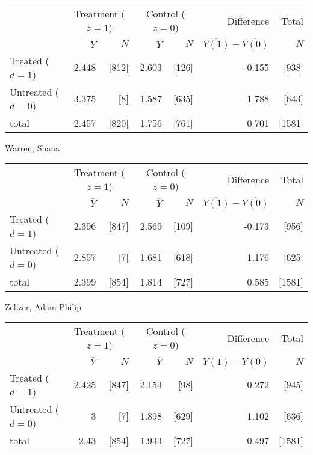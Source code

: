 \documentclass[11pt,notitlepage]{article}
\begin{document}
\begin{table}[h!]
\begin{center}
\begin{tabular}{l|rr|rr|rr}
  \hline
 & \multicolumn{2}{c|}{Treatment ($z=1$)} & \multicolumn{2}{c|}{Control ($z=0$)} & Difference & Total \\
 & $\overline{Y}$ & $N$ & $\overline{Y}$ & $N$ & $\overline{Y(1)} - \overline{Y(0)}$ & $N$ \\ 
  \hline
Treated ($d=1$) &  2.448 & [812] & 2.603 & [126] & -0.155 & [938] \\ 
  Untreated ($d=0$) & 3.375 & [8] & 1.587 & [635] & 1.788 & [643] \\ 
  \hline
  total & 2.457 & [820] & 1.756 & [761] & 0.701 & [1581] \\ 
   \hline
\end{tabular}
\end{center}
\end{table}
Warren, Shana

\begin{table}[h!]
\begin{center}
\begin{tabular}{l|rr|rr|rr}
  \hline
 & \multicolumn{2}{c|}{Treatment ($z=1$)} & \multicolumn{2}{c|}{Control ($z=0$)} & Difference & Total \\
 & $\overline{Y}$ & $N$ & $\overline{Y}$ & $N$ & $\overline{Y(1)} - \overline{Y(0)}$ & $N$ \\ 
  \hline
Treated ($d=1$) &  2.396 & [847] & 2.569 & [109] & -0.173 & [956] \\ 
  Untreated ($d=0$) & 2.857 & [7] & 1.681 & [618] & 1.176 & [625] \\ 
  \hline
  total & 2.399 & [854] & 1.814 & [727] & 0.585 & [1581] \\ 
   \hline
\end{tabular}
\end{center}
\end{table}
Zelizer, Adam Philip

\begin{table}[h!]
\begin{center}
\begin{tabular}{l|rr|rr|rr}
  \hline
 & \multicolumn{2}{c|}{Treatment ($z=1$)} & \multicolumn{2}{c|}{Control ($z=0$)} & Difference & Total \\
 & $\overline{Y}$ & $N$ & $\overline{Y}$ & $N$ & $\overline{Y(1)} - \overline{Y(0)}$ & $N$ \\ 
  \hline
Treated ($d=1$) &  2.425 & [847] & 2.153 & [98] & 0.272 & [945] \\ 
  Untreated ($d=0$) & 3 & [7] & 1.898 & [629] & 1.102 & [636] \\ 
  \hline
  total & 2.43 & [854] & 1.933 & [727] & 0.497 & [1581] \\ 
   \hline
\end{tabular}
\end{center}
\end{table}
\end{document}
